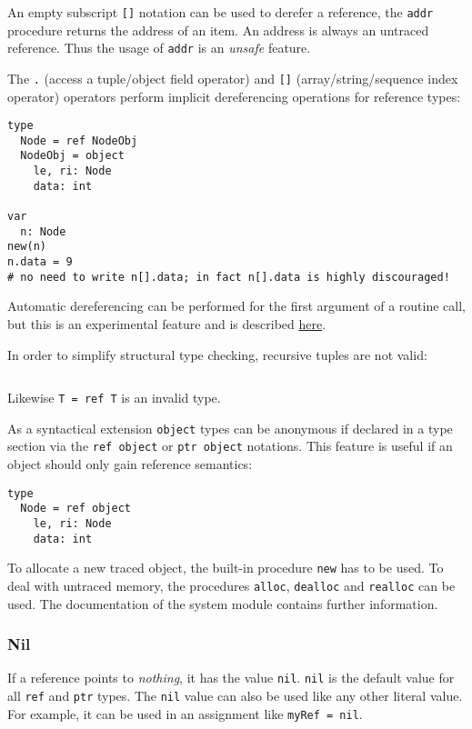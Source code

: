 An empty subscript \texttt{{[}{]}} notation can be used to derefer a
reference, the \texttt{addr} procedure returns the address of an item.
An address is always an untraced reference. Thus the usage of
\texttt{addr} is an \emph{unsafe} feature.

The \texttt{.} (access a tuple/object field operator) and
\texttt{{[}{]}} (array/string/sequence index operator) operators perform
implicit dereferencing operations for reference types:

\begin{verbatim}
type
  Node = ref NodeObj
  NodeObj = object
    le, ri: Node
    data: int

var
  n: Node
new(n)
n.data = 9
# no need to write n[].data; in fact n[].data is highly discouraged!
\end{verbatim}

Automatic dereferencing can be performed for the first argument of a
routine call, but this is an experimental feature and is described
\href{manual_experimental.html\#type-bound-operations}{here}.

In order to simplify structural type checking, recursive tuples are not
valid:

\begin{verbatim}
\end{verbatim}

Likewise \texttt{T\ =\ ref\ T} is an invalid type.

As a syntactical extension \texttt{object} types can be anonymous if
declared in a type section via the \texttt{ref\ object} or
\texttt{ptr\ object} notations. This feature is useful if an object
should only gain reference semantics:

\begin{verbatim}
type
  Node = ref object
    le, ri: Node
    data: int
\end{verbatim}

To allocate a new traced object, the built-in procedure \texttt{new} has
to be used. To deal with untraced memory, the procedures \texttt{alloc},
\texttt{dealloc} and \texttt{realloc} can be used. The documentation of
the system module contains further information.

\hypertarget{nil}{%
\subsubsection{Nil}\label{nil}}

If a reference points to \emph{nothing}, it has the value \texttt{nil}.
\texttt{nil} is the default value for all \texttt{ref} and \texttt{ptr}
types. The \texttt{nil} value can also be used like any other literal
value. For example, it can be used in an assignment like
\texttt{myRef\ =\ nil}.


